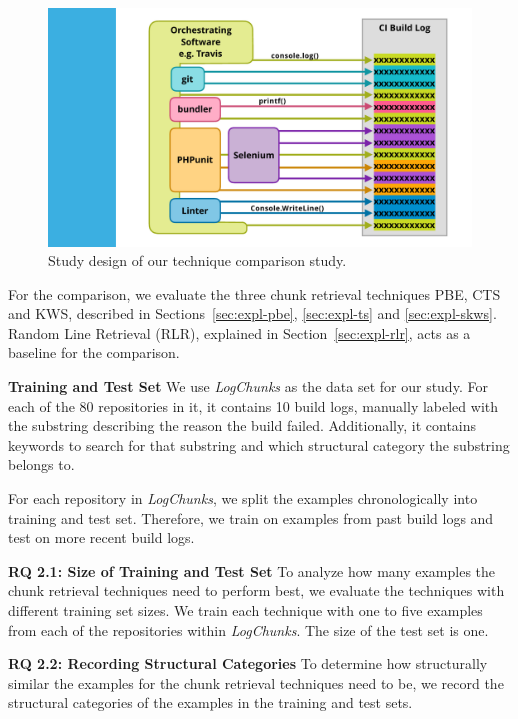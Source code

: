 \begin{figure}[!t]
	\centering
	\includegraphics[page=2, width=\columnwidth, trim={0cm 1cm 1.5cm 0.5cm}, clip]{img/overview-graphics.pdf}
	\caption{Study design of our technique comparison study.}
	\label{fig:study}
\end{figure}


For the comparison, we evaluate the three chunk retrieval techniques PBE, CTS and KWS, described in Sections~\ref{sec:expl-pbe}, \ref{sec:expl-ts} and \ref{sec:expl-skws}.
Random Line Retrieval (RLR), explained in Section~\ref{sec:expl-rlr}, acts as a baseline for the comparison.

\noindent
\textbf{Training and Test Set}
We use \emph{LogChunks} as the data set for our study.
For each of the 80 repositories in it, it contains 10 build logs, manually labeled with the substring describing the reason the build failed.
Additionally, it contains keywords to search for that substring and which structural category the substring belongs to.

For each repository in \emph{LogChunks}, we split the examples chronologically into training and test set.
Therefore, we train on examples from past build logs and test on more recent build logs.

\noindent
\textbf{RQ 2.1: Size of Training and Test Set}
To analyze how many examples the chunk retrieval techniques need to perform best, we evaluate the techniques with different training set sizes.
We train each technique with one to five examples from each of the repositories within \emph{LogChunks}.
The size of the test set is one.

\noindent
\textbf{RQ 2.2: Recording Structural Categories}
To determine how structurally similar the examples for the chunk retrieval techniques need to be, we record the structural categories of the examples in the training and test sets.

